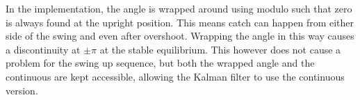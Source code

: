 In the implementation, the angle is wrapped around using modulo such that zero is always found at the upright position. This means catch can happen from either side of the swing and even after overshoot. Wrapping the angle in this way causes a discontinuity at $\pm \pi$ at the stable equilibrium. This however does not cause a problem for the swing up sequence, but both the wrapped angle and the continuous are kept accessible, allowing the Kalman filter to use the continuous version.